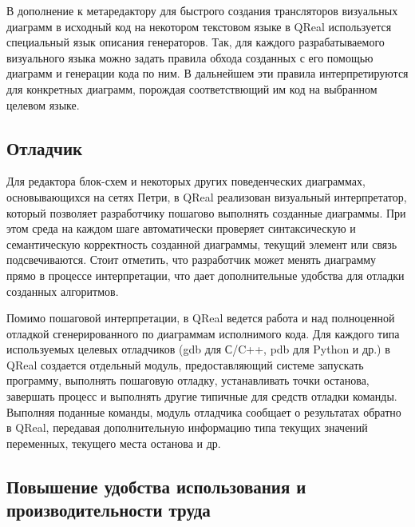 \documentclass[a4paper]{article}
\begin{document}
В дополнение к метаредактору для быстрого создания трансляторов визуальных диаграмм в исходный код на некотором текстовом языке в QReal используется специальный язык описания генераторов. Так, для каждого разрабатываемого визуального языка можно задать правила обхода созданных с его помощью диаграмм и генерации кода по ним. В дальнейшем эти правила интерпретируются для конкретных диаграмм, порождая соответствющий им код на выбранном целевом языке.
  
\subsection{Отладчик}

Для редактора блок-схем и некоторых других поведенческих диаграммах, основывающихся на сетях Петри, в QReal реализован визуальный интерпретатор, который позволяет разработчику пошагово выполнять созданные диаграммы. При этом среда на каждом шаге автоматически проверяет синтаксическую и семантическую корректность созданной диаграммы, текущий элемент или связь подсвечиваются. Стоит отметить, что разработчик может менять диаграмму прямо в процессе интерпретации, что дает дополнительные удобства для отладки созданных алгоритмов. 
  
Помимо пошаговой интерпретации, в QReal ведется работа и над полноценной отладкой сгенерированного по диаграммам исполнимого кода. Для каждого типа используемых целевых отладчиков (gdb для С/C++, pdb для Python и др.) в QReal создается отдельный модуль, предоставляющий системе запускать программу, выполнять пошаговую отладку, устанавливать точки останова, завершать процесс и выполнять другие типичные для средств отладки команды. Выполняя поданные команды, модуль отладчика сообщает о результатах обратно в QReal, передавая дополнительную информацию типа текущих значений переменных, текущего места останова и др. 
  
\subsection{Повышение удобства использования и производительности труда}
\end{document}
